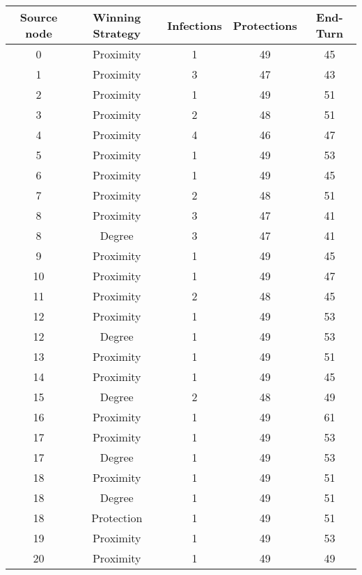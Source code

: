 \documentclass[results.tex]{subfiles}
\begin{document}
\begin{center}
  \begin{tabular}{| c || c | c | c | c |}
    \hline
    {\bfseries Source node} & {\bfseries Winning Strategy} & {\bfseries Infections} & {\bfseries Protections} & {\bfseries End-Turn} \\  %
    \hline\hline
    0 & Proximity & 1 & 49 & 45 \\ 
    \hline
    1 & Proximity & 3 & 47 & 43 \\ 
    \hline
    2 & Proximity & 1 & 49 & 51 \\ 
    \hline
    3 & Proximity & 2 & 48 & 51 \\ 
    \hline
    4 & Proximity & 4 & 46 & 47 \\ 
    \hline
    5 & Proximity & 1 & 49 & 53 \\ 
    \hline
    6 & Proximity & 1 & 49 & 45 \\ 
    \hline
    7 & Proximity & 2 & 48 & 51 \\ 
    \hline
    8 & Proximity & 3 & 47 & 41 \\ 
    \hline
    8 & Degree & 3 & 47 & 41 \\ 
    \hline
    9 & Proximity & 1 & 49 & 45 \\ 
    \hline
    10 & Proximity & 1 & 49 & 47 \\ 
    \hline
    11 & Proximity & 2 & 48 & 45 \\ 
    \hline
    12 & Proximity & 1 & 49 & 53 \\ 
    \hline
    12 & Degree & 1 & 49 & 53 \\ 
    \hline
    13 & Proximity & 1 & 49 & 51 \\ 
    \hline
    14 & Proximity & 1 & 49 & 45 \\ 
    \hline
    15 & Degree & 2 & 48 & 49 \\ 
    \hline
    16 & Proximity & 1 & 49 & 61 \\ 
    \hline
    17 & Proximity & 1 & 49 & 53 \\ 
    \hline
    17 & Degree & 1 & 49 & 53 \\ 
    \hline
    18 & Proximity & 1 & 49 & 51 \\ 
    \hline
    18 & Degree & 1 & 49 & 51 \\ 
    \hline
    18 & Protection & 1 & 49 & 51 \\ 
    \hline
    19 & Proximity & 1 & 49 & 53 \\ 
    \hline
    20 & Proximity & 1 & 49 & 49 \\ 

\end{tabular}
\end{center}
\end{document}
